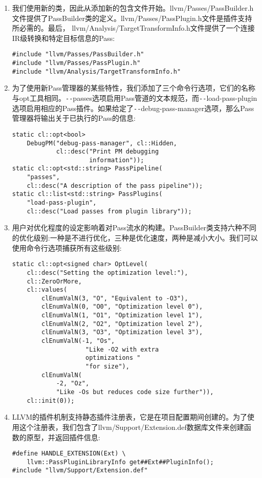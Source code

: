\begin{enumerate}
\item 我们使用新的类，因此从添加新的包含文件开始。llvm/Passes/PassBuilder.h文件提供了PassBuilder类的定义。llvm/Passes/PassPlugin.h文件是插件支持所必需的。最后， llvm/Analy\allowbreak sis/TargetTransformInfo.h文件提供了一个连接IR级转换和特定目标信息的Pass:
\begin{lstlisting}[caption={}]
#include "llvm/Passes/PassBuilder.h"
#include "llvm/Passes/PassPlugin.h"
#include "llvm/Analysis/TargetTransformInfo.h"
\end{lstlisting}

\item 为了使用新Pass管理器的某些特性，我们添加了三个命令行选项，它们的名称与opt工具相同。\verb|--|passes选项启用Pass管道的文本规范，而\verb|--|load-pass-plugin选项启用相应的Pass插件。如果给定了\verb|--|debug-pass-manager选项，那么Pass管理器将输出关于已执行的Pass的信息:
\begin{lstlisting}[caption={}]
static cl::opt<bool>
	DebugPM("debug-pass-manager", cl::Hidden,
			cl::desc("Print PM debugging 
					 information"));
static cl::opt<std::string> PassPipeline(
	"passes",
	cl::desc("A description of the pass pipeline"));
static cl::list<std::string> PassPlugins(
	"load-pass-plugin",
	cl::desc("Load passes from plugin library"));
\end{lstlisting}

\item 用户对优化程度的设定影响着对Pass流水的构建。PassBuilder类支持六种不同的优化级别:一种是不进行优化，三种是优化速度，两种是减小大小。我们可以使用命令行选项捕获所有这些级别:
\begin{lstlisting}[caption={}]
static cl::opt<signed char> OptLevel(
	cl::desc("Setting the optimization level:"),
	cl::ZeroOrMore,
	cl::values(
		clEnumValN(3, "O", "Equivalent to -O3"),
		clEnumValN(0, "O0", "Optimization level 0"),
		clEnumValN(1, "O1", "Optimization level 1"),
		clEnumValN(2, "O2", "Optimization level 2"),
		clEnumValN(3, "O3", "Optimization level 3"),
		clEnumValN(-1, "Os",
					"Like -O2 with extra 
					optimizations "
					"for size"),
		clEnumValN(
			-2, "Oz",
			"Like -Os but reduces code size further")),
	cl::init(0));
\end{lstlisting}

\item LLVM的插件机制支持静态插件注册表，它是在项目配置期间创建的。为了使用这个注册表，我们包含了llvm/Support/Extension.def数据库文件来创建函数的原型，并返回插件信息:
\begin{lstlisting}[caption={}]
#define HANDLE_EXTENSION(Ext) \
	llvm::PassPluginLibraryInfo get##Ext##PluginInfo();
#include "llvm/Support/Extension.def"
\end{lstlisting}


\end{enumerate}
